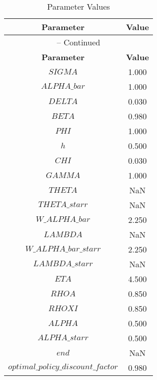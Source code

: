 \begin{center}
\begin{longtable}{cc}
\caption{Parameter Values}\\%
\toprule%
\multicolumn{1}{c}{\textbf{Parameter}} &
\multicolumn{1}{c}{\textbf{Value}}  \\%
\midrule%
\endfirsthead
\multicolumn{2}{c}{{\tablename} \thetable{} -- Continued}\\%
\midrule%
\multicolumn{1}{c}{\textbf{Parameter}} &
\multicolumn{1}{c}{\textbf{Value}} \\%
\midrule%
\endhead
$SIGMA$ 	 & 	 1.000 \\
$ALPHA\_bar$ 	 & 	 1.000 \\
$DELTA$ 	 & 	 0.030 \\
$BETA$ 	 & 	 0.980 \\
$PHI$ 	 & 	 1.000 \\
$h$ 	 & 	 0.500 \\
$CHI$ 	 & 	 0.030 \\
$GAMMA$ 	 & 	 1.000 \\
$THETA$ 	 & 	  NaN \\
$THETA\_starr$ 	 & 	  NaN \\
$W\_ALPHA\_bar$ 	 & 	 2.250 \\
$LAMBDA$ 	 & 	  NaN \\
$W\_ALPHA\_bar\_starr$ 	 & 	 2.250 \\
$LAMBDA\_starr$ 	 & 	  NaN \\
$ETA$ 	 & 	 4.500 \\
$RHOA$ 	 & 	 0.850 \\
$RHOXI$ 	 & 	 0.850 \\
$ALPHA$ 	 & 	 0.500 \\
$ALPHA\_starr$ 	 & 	 0.500 \\
$end$ 	 & 	  NaN \\
$optimal\_policy\_discount\_factor$ 	 & 	 0.980 \\
\bottomrule%
\end{longtable}
\end{center}
